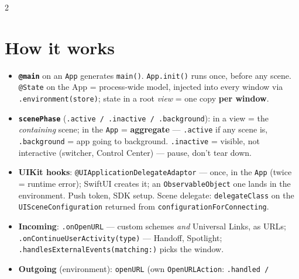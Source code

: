 \documentclass[8pt]{extarticle}
\begin{document}



\begin{multicols}{2}
\raggedright

\section{How it works}
\begin{itemize}
  \item \textbf{\texttt{@main}} on an \texttt{App} generates \texttt{main()}. \texttt{App.init()} runs once,
        before any scene. \texttt{@State} on the App = process-wide model, injected into every window via
        \texttt{.environment(store)}; state in a root \emph{view} = one copy \textbf{per window}.
  \item \textbf{\texttt{scenePhase}} (\texttt{.active / .inactive / .background}): in a view = the
        \emph{containing} scene; in the \texttt{App} = \textbf{aggregate} — \texttt{.active} if any scene is,
        \texttt{.background} = app going to background. \texttt{.inactive} = visible, not interactive
        (switcher, Control Center) — pause, don't tear down.
  \item \textbf{UIKit hooks}: \texttt{@UIApplicationDelegateAdaptor} — once, in the \texttt{App} (twice =
        runtime error); SwiftUI creates it; an \texttt{ObservableObject} one lands in the environment. Push
        token, SDK setup. Scene delegate: \texttt{delegateClass} on the \texttt{UISceneConfiguration} returned
        from \texttt{configurationForConnecting}.
  \item \textbf{Incoming}: \texttt{.onOpenURL} — custom schemes \emph{and} Universal Links, as URLs;
        \texttt{.onContinueUserActivity(type)} — Handoff, Spotlight; \texttt{.handlesExternalEvents(matching:)}
        picks the window.
  \item \textbf{Outgoing} (environment): \texttt{openURL} (own \texttt{OpenURLAction}: \texttt{.handled /
}
\end{itemize}
\end{multicols}
\end{document}
